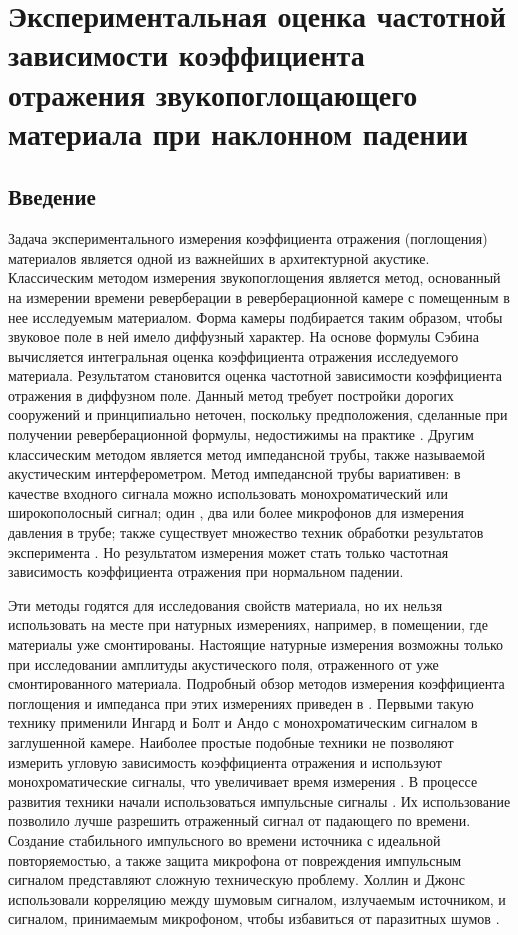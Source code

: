 \chapter{Экспериментальная оценка частотной зависимости коэффициента отражения звукопоглощающего материала при наклонном падении}

\section{Введение}
Задача экспериментального измерения коэффициента отражения (поглощения) материалов является одной из важнейших в архитектурной акустике. Классическим методом измерения звукопоглощения является метод, основанный на измерении времени реверберации в реверберационной камере \cite{Blauert} с помещенным в нее исследуемым материалом. Форма камеры подбирается таким образом, чтобы звуковое поле в ней имело диффузный характер. На основе формулы Сэбина вычисляется интегральная оценка коэффициента отражения исследуемого материала. Результатом становится оценка частотной зависимости коэффициента отражения в диффузном поле. Данный метод требует постройки дорогих сооружений и принципиально неточен, поскольку предположения, сделанные при получении реверберационной формулы, недостижимы на практике \cite{Kosten}. Другим классическим методом является метод импедансной трубы, также называемой акустическим интерферометром. Метод импедансной трубы вариативен: в качестве входного сигнала можно использовать монохроматический \cite{Beranek} или широкополосный \cite{ASTM} сигнал; один \cite{Fahy1984}, два \cite{Seybert} или более \cite{Chung1980I, Chung1980II} микрофонов для измерения давления в трубе; также существует множество техник обработки результатов эксперимента \cite{Chu1991}. Но результатом измерения может стать только частотная зависимость коэффициента отражения при нормальном падении.

Эти методы годятся для исследования свойств материала, но их нельзя использовать на месте при натурных измерениях, например, в помещении, где материалы уже смонтированы. Настоящие натурные измерения возможны только при исследовании амплитуды акустического поля, отраженного от уже смонтированного материала. Подробный обзор методов измерения коэффициента поглощения и импеданса при этих измерениях приведен в \cite{Brandao2015}. Первыми такую технику применили Ингард и Болт \cite{Ingard1951} и Андо \cite{Ando1968} с монохроматическим сигналом в заглушенной камере. Наиболее простые подобные техники не позволяют измерить угловую зависимость коэффициента отражения и используют монохроматические сигналы, что увеличивает время измерения \cite{Yuzawa1975}. В процессе развития техники начали использоваться импульсные сигналы \cite{Davies1979, Kintzl}. Их использование позволило лучше разрешить отраженный сигнал от падающего по времени. Создание стабильного импульсного во времени источника с идеальной повторяемостью, а также защита микрофона от повреждения импульсным сигналом представляют сложную техническую проблему. Холлин и Джонс использовали корреляцию между шумовым сигналом, излучаемым источником, и сигналом, принимаемым микрофоном, чтобы избавиться от паразитных шумов \cite{Hollin1977}. 

